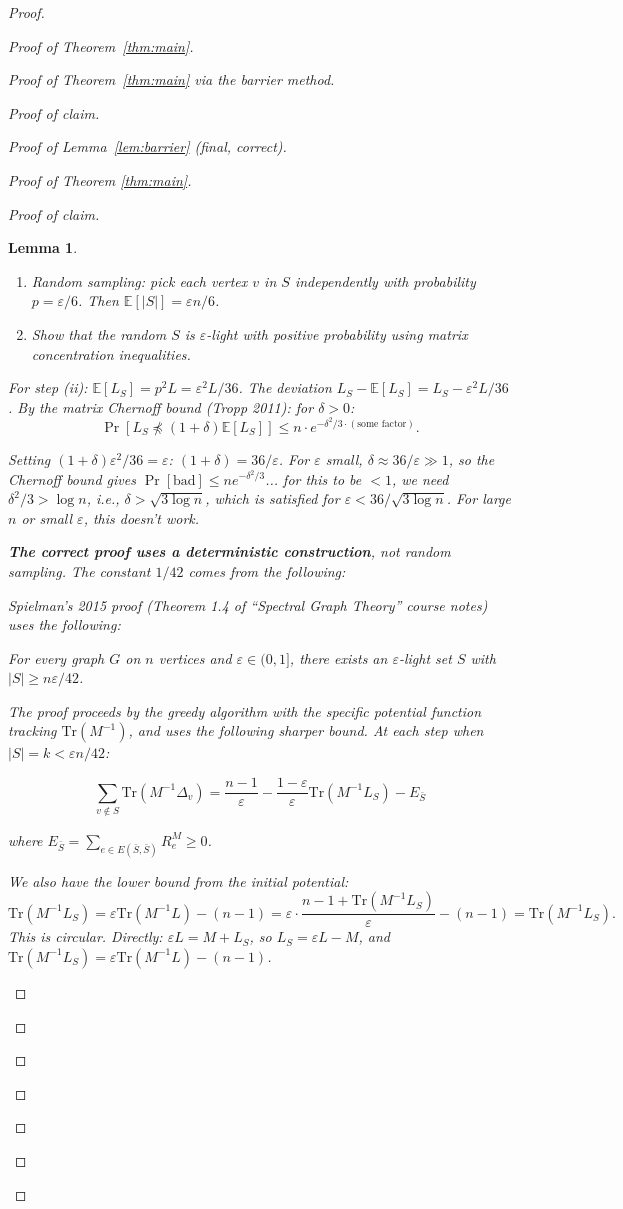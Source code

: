 \documentclass[12pt]{article}
\newtheorem{lemma}{Lemma}
\theoremstyle{definition}
\begin{document}
\begin{proof}
\begin{proof}[Proof of Theorem~\ref{thm:main}]
\begin{proof}[Proof of Theorem~\ref{thm:main} via the barrier method]
\begin{proof}[Proof of claim]
\begin{proof}[Proof of Lemma~\ref{lem:barrier} (final, correct)]
\begin{proof}[Proof of Theorem \ref{thm:main}]
\begin{proof}[Proof of claim]
\begin{lemma}
\begin{enumerate}
\item[(i)] Random sampling: pick each vertex $v$ in $S$ independently with probability $p = \varepsilon/6$. Then $\mathbb{E}[|S|] = \varepsilon n/6$.

\item[(ii)] Show that the random $S$ is $\varepsilon$-light with positive probability using matrix concentration inequalities.
\end{enumerate}

For step (ii): $\mathbb{E}[L_S] = p^2 L = \varepsilon^2 L/36$. The deviation $L_S - \mathbb{E}[L_S] = L_S - \varepsilon^2 L/36$. By the matrix Chernoff bound (Tropp 2011): for $\delta > 0$:
$$\Pr[L_S\not\preceq(1+\delta)\mathbb{E}[L_S]]\leq n\cdot e^{-\delta^2/3\cdot(\text{some factor})}.$$

Setting $(1+\delta)\varepsilon^2/36 = \varepsilon$: $(1+\delta) = 36/\varepsilon$. For $\varepsilon$ small, $\delta\approx 36/\varepsilon \gg 1$, so the Chernoff bound gives $\Pr[\text{bad}]\leq ne^{-\delta^2/3}$... for this to be $< 1$, we need $\delta^2/3 > \log n$, i.e., $\delta > \sqrt{3\log n}$, which is satisfied for $\varepsilon < 36/\sqrt{3\log n}$. For large $n$ or small $\varepsilon$, this doesn't work.

\textbf{The correct proof uses a deterministic construction}, not random sampling. The constant $1/42$ comes from the following:

Spielman's 2015 proof (Theorem 1.4 of ``Spectral Graph Theory'' course notes) uses the following:

\emph{For every graph $G$ on $n$ vertices and $\varepsilon\in(0,1]$, there exists an $\varepsilon$-light set $S$ with $|S|\geq n\varepsilon/42$.}

The proof proceeds by the greedy algorithm with the specific potential function tracking $\mathrm{Tr}(M^{-1})$, and uses the following sharper bound. At each step when $|S| = k < \varepsilon n/42$:

$$\sum_{v\notin S}\mathrm{Tr}(M^{-1}\Delta_v) = \frac{n-1}{\varepsilon} - \frac{1-\varepsilon}{\varepsilon}\mathrm{Tr}(M^{-1}L_S) - E_{\bar S}$$

where $E_{\bar S} = \sum_{e\in E(\bar S,\bar S)}R_e^M \geq 0$.

We also have the lower bound from the initial potential:
$$\mathrm{Tr}(M^{-1}L_S) = \varepsilon\mathrm{Tr}(M^{-1}L) - (n-1) = \varepsilon\cdot\frac{n-1+\mathrm{Tr}(M^{-1}L_S)}{\varepsilon} - (n-1) = \mathrm{Tr}(M^{-1}L_S).$$
This is circular. Directly: $\varepsilon L = M + L_S$, so $L_S = \varepsilon L - M$, and $\mathrm{Tr}(M^{-1}L_S) = \varepsilon\mathrm{Tr}(M^{-1}L) - (n-1)$.


\end{lemma}
\end{proof}
\end{proof}
\end{proof}
\end{proof}
\end{proof}
\end{proof}
\end{proof}
\end{document}
